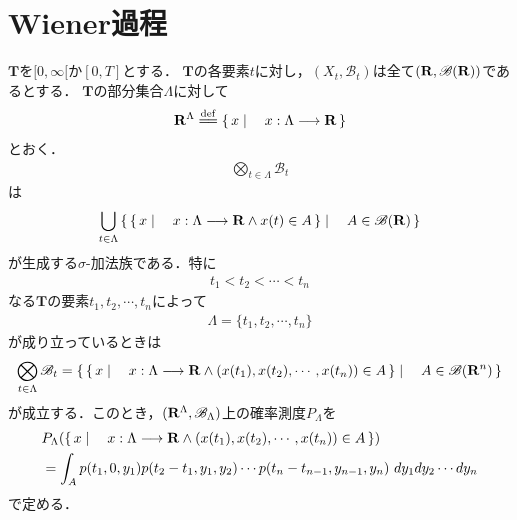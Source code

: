 \section{Wiener過程}
\label{sec:Wiener_process}
	$\mathbf{T}$を$[0,\infty[$か$[0,T]$とする．
	$\mathbf{T}$の各要素$t$に対し，$(X_t,\mathscr{B}_t)$は全て$(\mathbf{R},\mathscr{B}(\mathbf{R}))$であるとする．
	$\mathbf{T}$の部分集合$\Lambda$に対して
	\begin{align}
		\R^\Lambda \defeq \Set{x}{x:\Lambda \longrightarrow \R}
	\end{align}
	とおく．
	\begin{align}
		\bigotimes_{t \in \Lambda} \mathscr{B}_t
	\end{align}
	は
	\begin{align}
		\bigcup_{t \in \Lambda} \left\{\, \left\{\, x \mid \quad x:\Lambda \longrightarrow \mathbf{R} \wedge x(t) \in A\, \right\} \mid \quad A \in \mathscr{B}(\mathbf{R})\, \right\}
	\end{align}
	が生成する$\sigma$-加法族である．特に
	\begin{align}
		t_1 < t_2 < \cdots < t_n
	\end{align}
	なる$\mathbf{T}$の要素$t_1,t_2,\cdots,t_n$によって
	\begin{align}
		\Lambda = \{t_1,t_2,\cdots,t_n\}
	\end{align}
	が成り立っているときは
	\begin{align}
		\bigotimes_{t \in \Lambda} \mathscr{B}_t
		= \left\{\, \left\{\, x \mid \quad x:\Lambda \longrightarrow \mathbf{R} \wedge (x(t_1),x(t_2),\cdots,x(t_n)) \in A\, \right\} \mid \quad A \in \mathscr{B}(\mathbf{R}^n)\, \right\}
	\end{align}
	が成立する．このとき，$(\mathbf{R}^\Lambda,\mathscr{B}_\Lambda)$上の確率測度$P_\Lambda$を
	\begin{align}
		&P_\Lambda(\left\{\, x \mid \quad x:\Lambda \longrightarrow \mathbf{R} \wedge (x(t_1),x(t_2),\cdots,x(t_n)) \in A\, \right\}) \\
		&= \int_A p(t_1,0,y_1)p(t_2-t_1,y_1,y_2) \cdots p(t_n-t_{n-1},y_{n-1},y_n)\ dy_1 dy_2\cdots dy_n
	\end{align}
	で定める．